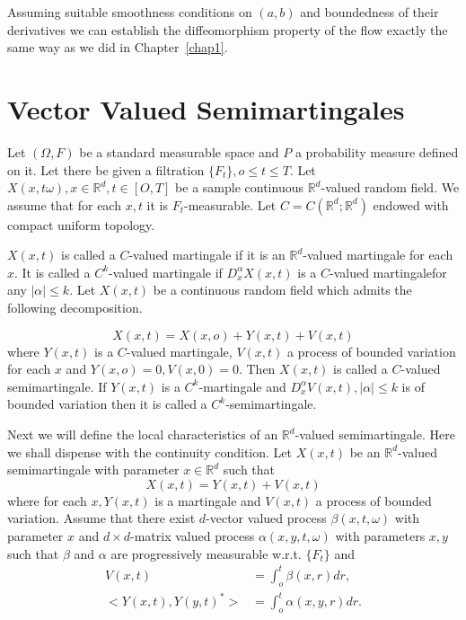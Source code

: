 \setcounter{remark}{5}
\begin{remark}%
  Assuming suitable smoothness conditions on $(a, b)$ and boundedness
  of their derivatives we can establish the diffeomorphism property of
  the flow exactly the same way as we did in Chapter~\ref{chap1}. 
\end{remark}

\section{Vector Valued Semimartingales}\label{chap2:sec2.2}%

Let $(\Omega, F)$ be a standard measurable space and $P$ a probability
measure defined on it. Let there be given a filtration $\{F_t\}, o
\leq t \leq T$.  Let $X(x, t \omega), x \in \mathbb{R}^d, t
\in [O, T]$ be a sample continuous $\mathbb{R}^d$-valued
random field. We assume that for each $x, t$ it is
$F_t$-measurable. Let $C=C(\mathbb{R}^d;\mathbb{R}^d)$ endowed with
compact uniform topology. 

\begin{definition}\label{c2:def2.2.1}%
  $X(x, t)$ is called a $C$-valued martingale if it is an
  $\mathbb{R}^d$-valued martingale for each $x$. It is called a
  $C^k$-valued martingale if $D^\alpha_x X(x, t)$ is a $C$-valued
  martingale\pageoriginale for any $|\alpha|\leq k$. Let $X(x,t)$ be a continuous
  random field which admits the following decomposition. 
\end{definition}
$$
X(x,t)=X(x,o)+Y(x,t)+V(x,t)
$$
where $Y(x, t)$ is a $C$-valued martingale, $V(x,t)$ a process of
bounded variation for each $x$ and $Y(x, o)=0, V(x,0)=0$. Then $X(x,
t)$ is called a $C$-valued semimartingale. If $Y(x, t)$ is a
$C^k$-martingale and $D^\alpha_x V(x, t), |\alpha | \leq k$ is of
bounded variation then it is called a $C^k$-semimartingale. 

Next we will define the local characteristics of an
$\mathbb{R}^d$-valued semimartingale.  Here we shall dispense with the
continuity condition. Let $X(x, t)$ be an $\mathbb{R}^d$-valued
semimartingale with parameter $x \in \mathbb{R}^d$ such that 
$$
X(x,t)= Y(x,t)+V(x,t)
$$
where for each $x,Y(x, t)$ is a martingale and $V(x, t)$ a process of
bounded variation. Assume that there exist $d$-vector valued process
$\beta(x, t, \omega)$ with parameter $x$ and $d \times d$-matrix valued
process $\alpha(x,y,t,\omega)$ with parameters $x,y$ such that $\beta$
and $\alpha$ are progressively measurable w.r.t. $\{F_t\}$ and  
\begin{align*}
V(x,t) & = \int^t_o\beta (x,r)dr,\\
< Y(x,t), Y(y,t)^* > & = \int ^t _o \alpha(x,y,r)dr.
\end{align*}

